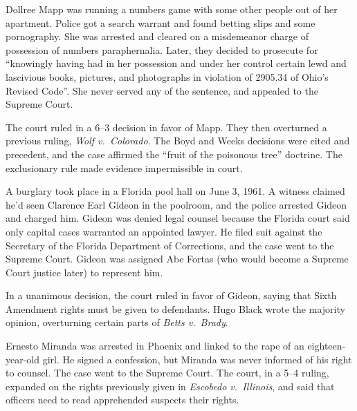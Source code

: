
Dollree Mapp was running a numbers game with some other people out of her apartment.
Police got a search warrant and found betting slips and some pornography.
She was arrested and cleared on a misdemeanor charge of possession of numbers paraphernalia.
Later, they decided to prosecute for
``knowingly having had in her possession and under her control certain lewd and lascivious books,
pictures, and photographs in violation of 2905.34 of Ohio's Revised Code''.
She never served any of the sentence, and appealed to the Supreme Court.

The court ruled in a 6--3 decision in favor of Mapp.
They then overturned a previous ruling, \textit{Wolf v.\ Colorado}.
The Boyd and Weeks decisions were cited and precedent,
and the case affirmed the ``fruit of the poisonous tree'' doctrine.
The exclusionary rule made evidence impermissible in court.


A burglary took place in a Florida pool hall on June 3, 1961.
A witness claimed he'd seen Clarence Earl Gideon in the poolroom, and the police arrested Gideon and charged him.
Gideon was denied legal counsel because the Florida court said only capital cases warranted an appointed lawyer.
He filed suit against the Secretary of the Florida Department of Corrections,
and the case went to the Supreme Court.
Gideon was assigned Abe Fortas (who would become a Supreme Court justice later) to represent him.

In a unanimous decision, the court ruled in favor of Gideon,
saying that Sixth Amendment rights must be given to defendants.
Hugo Black wrote the majority opinion, overturning certain parts of \textit{Betts v.\ Brady}.


Ernesto Miranda was arrested in Phoenix and linked to the rape of an eighteen-year-old girl.
He signed a confession, but Miranda was never informed of his right to counsel.
The case went to the Supreme Court.
The court, in a 5--4 ruling, expanded on the rights previously given in \textit{Escobedo v.\ Illinois},
and said that officers need to read apprehended suspects their rights.
